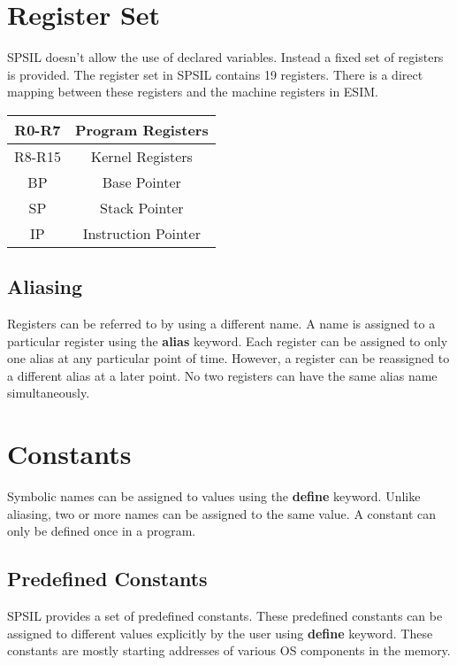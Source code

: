 \documentclass[11pt]{article}
\begin{document}
\section{Register Set}

SPSIL doesn't allow the use of declared variables. Instead a fixed set of registers is provided. The register set in SPSIL contains 19 registers. There is a direct mapping between these registers and the machine registers in ESIM.   \\

\begin{center}
\begin{tabular}{| c | c | }
\hline
R0-R7 & Program Registers \\
\hline
R8-R15 & Kernel Registers \\
\hline
BP 		& Base Pointer \\
\hline
SP		& Stack Pointer \\
\hline
IP		& Instruction Pointer \\
\hline
\end{tabular}
\end{center}

\subsection{Aliasing}
Registers can be referred to by using a different name. A name is assigned to a particular register using the \textbf{alias} keyword. Each register can be assigned to only one alias at any particular point of time. However, a  register can be reassigned to a different alias at a later point. No two registers can have the same alias name simultaneously.



\section{Constants}
Symbolic names can be assigned to values using the \textbf{define} keyword. Unlike aliasing, two or more names can be assigned to the same value. A constant can only be defined once in a program.
	
\subsection{Predefined Constants}
SPSIL provides a set of predefined constants. These predefined constants can be assigned to different values explicitly by the user using \textbf{define} keyword. These constants are mostly starting addresses of various OS components in the memory.
\end{document}
